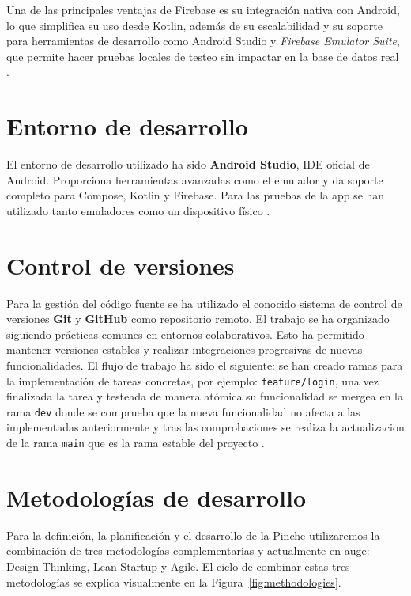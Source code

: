 Una de las principales ventajas de Firebase es su integración nativa con Android, lo que simplifica su uso desde Kotlin, además de su escalabilidad y su soporte para herramientas de desarrollo como Android Studio y \textit{Firebase Emulator Suite}, que permite hacer pruebas locales de testeo sin impactar en la base de datos real \cite{firebase-emulator}.

\section{Entorno de desarrollo}

El entorno de desarrollo utilizado ha sido \textbf{Android Studio}, IDE oficial de Android. Proporciona herramientas avanzadas como el emulador y da soporte completo para Compose, Kotlin y Firebase. Para las pruebas de la app se han utilizado tanto emuladores como un dispositivo físico \cite{android-studio}.

\section{Control de versiones}

Para la gestión del código fuente se ha utilizado el conocido sistema de control de versiones \textbf{Git} y \textbf{GitHub} como repositorio remoto. El trabajo se ha organizado siguiendo prácticas comunes en entornos colaborativos. Esto ha permitido mantener versiones estables y realizar integraciones progresivas de nuevas funcionalidades. El flujo de trabajo ha sido el siguiente: se han creado ramas para la implementación de tareas concretas, por ejemplo: \texttt{feature/login}, una vez finalizada la tarea y testeada de manera atómica su funcionalidad se mergea en la rama \texttt{dev} donde se comprueba que la nueva funcionalidad no afecta a las implementadas anteriormente y tras las comprobaciones se realiza la actualizacion de la rama \texttt{main} que es la rama estable del proyecto \cite{git} \cite{github}.

\section{Metodologías de desarrollo}

Para la definición, la planificación y el desarrollo de la Pinche utilizaremos la combinación de tres metodologías complementarias y actualmente en auge: Design Thinking, Lean Startup y Agile. El ciclo de combinar estas tres metodologías se explica visualmente en la Figura~\ref{fig:methodologies}.

